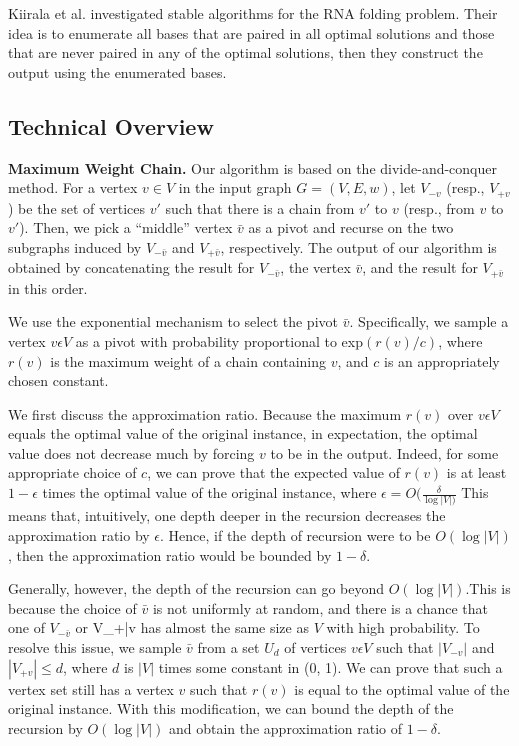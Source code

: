 \documentclass[preprint, 11pt]{article}
\begin{document}
Kiirala et al. \cite{9} investigated stable algorithms for the RNA folding problem. Their idea is to
enumerate all bases that are paired in all optimal solutions and those that are never paired in any
of the optimal solutions, then they construct the output using the enumerated bases.

\subsection{Technical Overview}
\textbf{Maximum Weight Chain.}  Our algorithm is based on the divide-and-conquer method. For a
vertex $v \in V$ in the input graph $G = (V, E, w)$, let $V_{-v}$ (resp., $V_{+v}$) be the set of vertices $v'$ such that there is a chain from $v'$ to $v$ (resp., from $v$ to $v'$). Then, we pick a “middle” vertex $\bar{v}$ as a pivot and recurse on the two subgraphs induced by $V_{-\bar{v}}$ and $V_{+\bar{v}}$, respectively. The output of our algorithm is obtained by concatenating the result for $V_{-\bar{v}}$, the vertex $\bar{v}$, and the result for $V_{+\bar{v}}$ in this order.

We use the exponential mechanism \cite{12} to select the pivot $\bar{v}$. Specifically, we sample a vertex $v \epsilon V$ as a pivot with probability proportional to exp$(r(v)/c)$, where $r(v)$ is the maximum weight
of a chain containing $v$, and $c$ is an appropriately chosen constant.

We first discuss the approximation ratio. Because the maximum $r(v)$ over $v \epsilon V$ equals the
optimal value of the original instance, in expectation, the optimal value does not decrease much
by forcing $v$ to be in the output. Indeed, for some appropriate choice of $c$, we can prove that
the expected value of $r(v)$ is at least $1 - \epsilon$ times the optimal value of the original instance, where $\epsilon = O(\frac{\delta}{\log |V|)}$ This means that, intuitively, one depth deeper in the recursion decreases the approximation ratio by $\epsilon$. Hence, if the depth of recursion were to be $O(\log |V|)$, then the approximation
ratio would be bounded by $1 - \delta$.

Generally, however, the depth of the recursion can go beyond $O(\log |V|)$.This is because the
choice of $\bar{v}$ is not uniformly at random, and there is a chance that one of $V_{-\bar{v}}$ or {V_{+\bar{v}}} has almost the
same size as $V$ with high probability. To resolve this issue, we sample $\bar{v}$ from a set $U_d$ of vertices $v \epsilon V$ such that $|V_{-v}|$ and $|V_{+v}| \leq d$, where $d$ is $|V|$ times some constant in (0, 1). We can
prove that such a vertex set still has a vertex $v$ such that $r(v)$ is equal to the optimal value of the
original instance. With this modification, we can bound the depth of the recursion by $O(\log |V|)$ and obtain the approximation ratio of $1 - \delta$.
\end{document}
